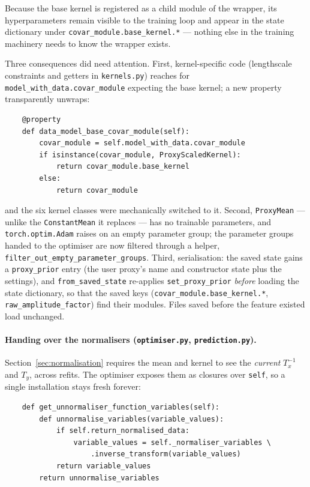 \documentclass[11pt,a4paper]{article}
\newcommand{\code}[1]{\texttt{#1}}
\begin{document}
Because the base kernel is registered as a child module of the wrapper, its
hyperparameters remain visible to the training loop and appear in the state
dictionary under \code{covar\_module.base\_kernel.*} --- nothing else in the
training machinery needs to know the wrapper exists.

Three consequences did need attention. First, kernel-specific code
(lengthscale constraints and getters in \code{kernels.py}) reaches for
\code{model\_with\_data.covar\_module} expecting the base kernel; a new
property transparently unwraps:

\begin{lstlisting}
    @property
    def data_model_base_covar_module(self):
        covar_module = self.model_with_data.covar_module
        if isinstance(covar_module, ProxyScaledKernel):
            return covar_module.base_kernel
        else:
            return covar_module
\end{lstlisting}

\noindent and the six kernel classes were mechanically switched to it.
Second, \code{ProxyMean} --- unlike the \code{ConstantMean} it replaces ---
has no trainable parameters, and \code{torch.optim.Adam} raises on an empty
parameter group; the parameter groups handed to the optimiser are now
filtered through a helper, \code{filter\_out\_empty\_parameter\_groups}.
Third, serialisation: the saved state gains a \code{proxy\_prior} entry
(the user proxy's name and constructor state plus the settings), and
\code{from\_saved\_state} re-applies \code{set\_proxy\_prior} \emph{before}
loading the state dictionary, so that the saved keys
(\code{covar\_module.base\_kernel.*}, \code{raw\_amplitude\_factor}) find
their modules. Files saved before the feature existed load unchanged.

\paragraph{Handing over the normalisers (\code{optimiser.py},
\code{prediction.py}).} Section~\ref{sec:normalisation} requires the mean
and kernel to see the \emph{current} $T_x^{-1}$ and $T_y$, across refits.
The optimiser exposes them as closures over \code{self}, so a single
installation stays fresh forever:

\begin{lstlisting}
    def get_unnormaliser_function_variables(self):
        def unnormalise_variables(variable_values):
            if self.return_normalised_data:
                variable_values = self._normaliser_variables \
                    .inverse_transform(variable_values)
            return variable_values
        return unnormalise_variables
\end{lstlisting}
\end{document}

